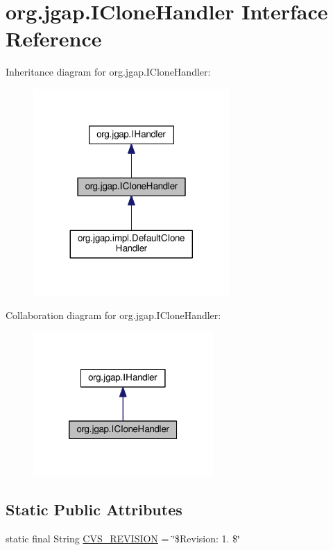 \hypertarget{interfaceorg_1_1jgap_1_1_i_clone_handler}{\section{org.\-jgap.\-I\-Clone\-Handler Interface Reference}
\label{interfaceorg_1_1jgap_1_1_i_clone_handler}
}


Inheritance diagram for org.\-jgap.\-I\-Clone\-Handler\-:
\nopagebreak
\begin{figure}[H]
\begin{center}
\leavevmode
\includegraphics[width=212pt]{interfaceorg_1_1jgap_1_1_i_clone_handler__inherit__graph}
\end{center}
\end{figure}


Collaboration diagram for org.\-jgap.\-I\-Clone\-Handler\-:
\nopagebreak
\begin{figure}[H]
\begin{center}
\leavevmode
\includegraphics[width=194pt]{interfaceorg_1_1jgap_1_1_i_clone_handler__coll__graph}
\end{center}
\end{figure}
\subsection*{Static Public Attributes}
\begin{DoxyCompactItemize}
\item 
static final String \hyperlink{interfaceorg_1_1jgap_1_1_i_clone_handler_a57398948552c34c664d80aee31960461}{C\-V\-S\-\_\-\-R\-E\-V\-I\-S\-I\-O\-N} = \char`\"{}\$Revision\-: 1. \$\char`\"{}
\end{DoxyCompactItemize}
